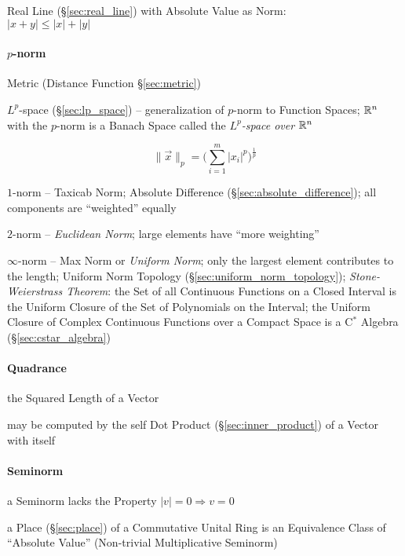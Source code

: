 Real Line (\S\ref{sec:real_line}) with Absolute Value as Norm:\\
$|x + y| \leq |x| + |y|$



\paragraph{$p$-norm}\label{sec:p_norm}\hfill

\fist Metric (Distance Function \S\ref{sec:metric})

\fist $L^p$-space (\S\ref{sec:lp_space}) -- generalization of $p$-norm to
Function Spaces;
$\mathbb{R}^n$ with the $p$-norm is a Banach Space called the
\emph{$L^p$-space over $\mathbb{R}^n$}

\[
  \|\vec{x}\|_p = \Big(\sum_{i=1}^m|x_i|^p\Big)^{\frac{1}{p}}
\]

$1$-norm -- Taxicab Norm; Absolute Difference (\S\ref{sec:absolute_difference});
all components are ``weighted'' equally

$2$-norm -- \emph{Euclidean Norm}; large elements have ``more weighting''

$\infty$-norm -- Max Norm or \emph{Uniform Norm}; only the largest element
contributes to the length; Uniform Norm Topology
(\S\ref{sec:uniform_norm_topology}); \emph{Stone-Weierstrass Theorem}: the Set
of all Continuous Functions on a Closed Interval is the Uniform Closure of the
Set of Polynomials on the Interval;
the Uniform Closure of Complex Continuous Functions over a Compact Space is a
C$^*$ Algebra (\S\ref{sec:cstar_algebra})



\paragraph{Quadrance}\label{sec:quadrance}\hfill

the Squared Length of a Vector

may be computed by the self Dot Product (\S\ref{sec:inner_product}) of a Vector
with itself



\paragraph{Seminorm}\label{sec:seminorm}\hfill

a Seminorm lacks the Property $|v| = 0 \Longrightarrow v = 0$

\fist a Place (\S\ref{sec:place}) of a Commutative Unital Ring is an
Equivalence Class of ``Absolute Value'' (Non-trivial Multiplicative Seminorm)



